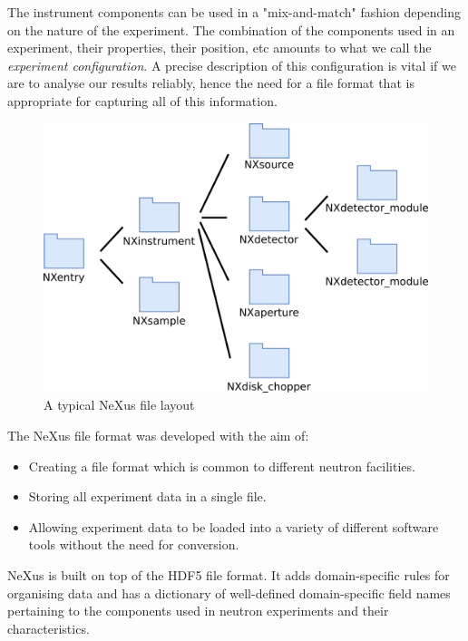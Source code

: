The instrument components can be used in a "mix-and-match" fashion depending on the nature of the experiment. The combination of the components used in an experiment, their properties, their position, etc amounts to what we call the \textit{experiment configuration}. A precise description of this configuration is vital if we are to analyse our results reliably, hence the need for a file format that is appropriate for capturing all of this information.

\begin{figure}
\begin{center}
\includegraphics[width=0.8\linewidth]{instrument_arch.png}
\end{center}
\caption{A typical NeXus file layout}
\vspace{-50pt}
\end{figure}

The NeXus file format was developed with the aim of:
\begin{itemize}
\item Creating a file format which is common to different neutron facilities.
\item Storing all experiment data in a single file.
\item Allowing experiment data to be loaded into a variety of different software tools without the need for conversion.
\end{itemize}
\smallskip
NeXus is built on top of the HDF5 file format. It adds domain-specific rules for organising data and has a dictionary of well-defined domain-specific field names pertaining to the components used in neutron experiments and their characteristics.
